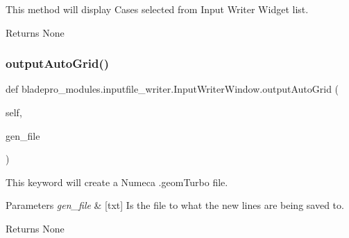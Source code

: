 This method will display Cases selected from Input Writer Widget list. 

\begin{DoxyReturn}{Returns}
None 
\end{DoxyReturn}
\hypertarget{classbladepro__modules_1_1inputfile__writer_1_1_input_writer_window_a61f9db1d33a2cb583c3f779a94ec700d}{}\label{classbladepro__modules_1_1inputfile__writer_1_1_input_writer_window_a61f9db1d33a2cb583c3f779a94ec700d} 
\subsubsection{\texorpdfstring{output\+Auto\+Grid()}{outputAutoGrid()}}
{\footnotesize\ttfamily def bladepro\+\_\+modules.\+inputfile\+\_\+writer.\+Input\+Writer\+Window.\+output\+Auto\+Grid (\begin{DoxyParamCaption}\item[{}]{self,  }\item[{}]{gen\+\_\+file }\end{DoxyParamCaption})}



This keyword will create a Numeca .geom\+Turbo file. 


\begin{DoxyParams}{Parameters}
{\em gen\+\_\+file} & \mbox{[}txt\mbox{]} Is the file to what the new lines are being saved to. \\
\hline
\end{DoxyParams}
\begin{DoxyReturn}{Returns}
None 
\end{DoxyReturn}
\hypertarget{classbladepro__modules_1_1inputfile__writer_1_1_input_writer_window_ab5d0d97e4bf1dd0ddf28f4f537fea598}{}\label{classbladepro__modules_1_1inputfile__writer_1_1_input_writer_window_ab5d0d97e4bf1dd0ddf28f4f537fea598} 
